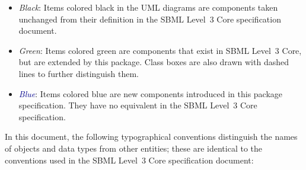 \begin{itemize}

\item[\raisebox{2.75pt}{\colorbox{black}{\rule{0.8pt}{0.8pt}}}]
  \emph{Black}: Items colored black in the UML diagrams are components
  taken unchanged from their definition in the SBML Level~3 Core
  specification document.

\item[\raisebox{2.75pt}{\colorbox{mediumgreen}{\rule{0.8pt}{0.8pt}}}]
  \emph{\textcolor{mediumgreen}{Green}}: Items colored green are
  components that exist in SBML Level~3 Core, but are extended by this
  package.  Class boxes are also drawn with dashed lines to further
  distinguish them.

\item[\raisebox{2.75pt}{\colorbox{darkblue}{\rule{0.8pt}{0.8pt}}}]
  \emph{\textcolor{darkblue}{Blue}}: Items colored blue are new
  components introduced in this package specification.  They have no
  equivalent in the SBML Level~3 Core specification.

\end{itemize}

In this document, the following typographical conventions distinguish the names of objects and data types from other entities; these are identical to the conventions used in the SBML Level~3 Core specification document:

